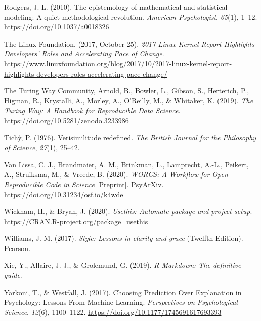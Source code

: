 \documentclass[12pt,a4paper,twoside]{article}
\begin{document}
\leavevmode\hypertarget{ref-rodgersEpistemologyMathematicalStatistical2010}{}%
Rodgers, J. L. (2010). The epistemology of mathematical and statistical modeling: A quiet methodological revolution. \emph{American Psychologist}, \emph{65}(1), 1--12. \url{https://doi.org/10.1037/a0018326}

\leavevmode\hypertarget{ref-thelinuxfoundation2017LinuxKernel2017}{}%
The Linux Foundation. (2017, October 25). \emph{2017 Linux Kernel Report Highlights Developers' Roles and Accelerating Pace of Change}. \url{https://www.linuxfoundation.org/blog/2017/10/2017-linux-kernel-report-highlights-developers-roles-accelerating-pace-change/}

\leavevmode\hypertarget{ref-theturingwaycommunityTuringWayHandbook2019}{}%
The Turing Way Community, Arnold, B., Bowler, L., Gibson, S., Herterich, P., Higman, R., Krystalli, A., Morley, A., O'Reilly, M., \& Whitaker, K. (2019). \emph{The Turing Way: A Handbook for Reproducible Data Science}. \url{https://doi.org/10.5281/zenodo.3233986}

\leavevmode\hypertarget{ref-tichyVerisimilitudeRedefined1976}{}%
Tichỳ, P. (1976). Verisimilitude redefined. \emph{The British Journal for the Philosophy of Science}, \emph{27}(1), 25--42.

\leavevmode\hypertarget{ref-vanlissaWORCSWorkflowOpen2020}{}%
Van Lissa, C. J., Brandmaier, A. M., Brinkman, L., Lamprecht, A.-L., Peikert, A., Struiksma, M., \& Vreede, B. (2020). \emph{WORCS: A Workflow for Open Reproducible Code in Science} {[}Preprint{]}. PsyArXiv. \url{https://doi.org/10.31234/osf.io/k4wde}

\leavevmode\hypertarget{ref-R-usethis}{}%
Wickham, H., \& Bryan, J. (2020). \emph{Usethis: Automate package and project setup}. \url{https://CRAN.R-project.org/package=usethis}

\leavevmode\hypertarget{ref-williamsStyleLessonsClarity2017}{}%
Williams, J. M. (2017). \emph{Style: Lessons in clarity and grace} (Twelfth Edition). Pearson.

\leavevmode\hypertarget{ref-xieMarkdownDefinitiveGuide2019}{}%
Xie, Y., Allaire, J. J., \& Grolemund, G. (2019). \emph{R Markdown: The definitive guide}.

\leavevmode\hypertarget{ref-yarkoniChoosingPredictionExplanation2017}{}%
Yarkoni, T., \& Westfall, J. (2017). Choosing Prediction Over Explanation in Psychology: Lessons From Machine Learning. \emph{Perspectives on Psychological Science}, \emph{12}(6), 1100--1122. \url{https://doi.org/10.1177/1745691617693393}
\end{document}
